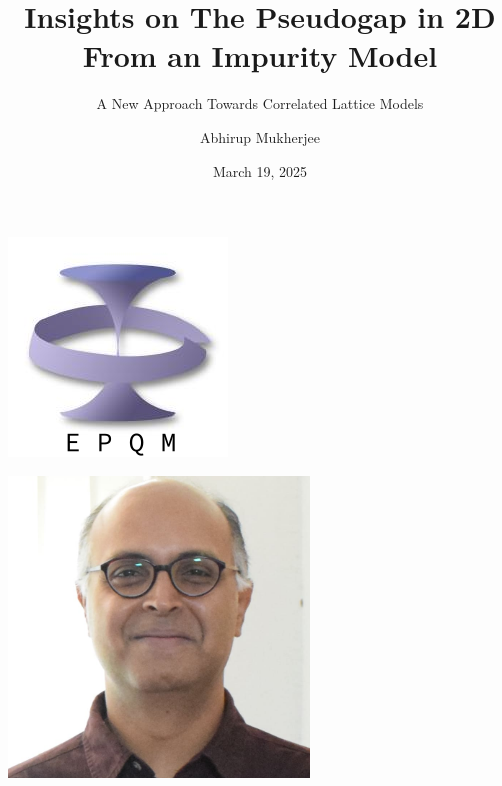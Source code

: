 \documentclass[10pt,aspectratio=169]{beamer}
\title{Insights on The Pseudogap in 2D From an Impurity Model}
\subtitle{A New Approach Towards Correlated Lattice Models}
\author{\alert{Abhirup Mukherjee}}
\date{March 19, 2025}
\institute{DPS Day '25 \\ Department of Physical Sciences, IISER Kolkata}
\begin{document}
\centering

\begin{frame}
\maketitle
\end{frame}

\begin{frame}{}
\hspace*{\fill}
\begin{minipage}{0.1\textwidth}
	\includegraphics[width=\textwidth]{epqm_logo_mod.jpeg}
\end{minipage}
\begin{minipage}{0.25\textwidth}
	\centering
	\includegraphics[width=0.6\textwidth]{slal.jpg}\\

\end{minipage}
\end{frame}
\end{document}
